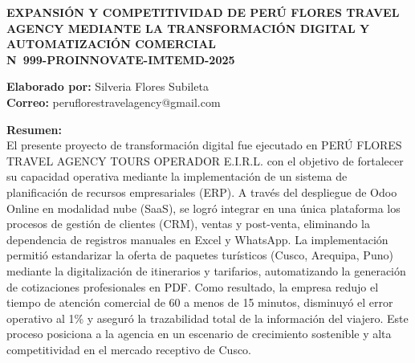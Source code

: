 \documentclass[12pt]{article}
\begin{document}
\vspace*{0.2cm}

\begin{center}
    {\large \textbf{EXPANSIÓN Y COMPETITIVIDAD DE PERÚ FLORES TRAVEL AGENCY MEDIANTE LA TRANSFORMACIÓN DIGITAL Y AUTOMATIZACIÓN COMERCIAL}}\\[0.4cm]
    {\large \textbf{N\textdegree\ 999-PROINNOVATE-IMTEMD-2025}}
\end{center}

\textbf{Elaborado por:} Silveria Flores Subileta\\
\textbf{Correo:} peruflorestravelagency@gmail.com

\textbf{Resumen:}\\
El presente proyecto de transformación digital fue ejecutado en PERÚ FLORES TRAVEL AGENCY TOURS OPERADOR E.I.R.L. con el objetivo de fortalecer su capacidad operativa mediante la implementación de un sistema de planificación de recursos empresariales (ERP). A través del despliegue de Odoo Online en modalidad nube (SaaS), se logró integrar en una única plataforma los procesos de gestión de clientes (CRM), ventas y post-venta, eliminando la dependencia de registros manuales en Excel y WhatsApp. La implementación permitió estandarizar la oferta de paquetes turísticos (Cusco, Arequipa, Puno) mediante la digitalización de itinerarios y tarifarios, automatizando la generación de cotizaciones profesionales en PDF. Como resultado, la empresa redujo el tiempo de atención comercial de 60 a menos de 15 minutos, disminuyó el error operativo al 1\% y aseguró la trazabilidad total de la información del viajero. Este proceso posiciona a la agencia en un escenario de crecimiento sostenible y alta competitividad en el mercado receptivo de Cusco.
\end{document}
